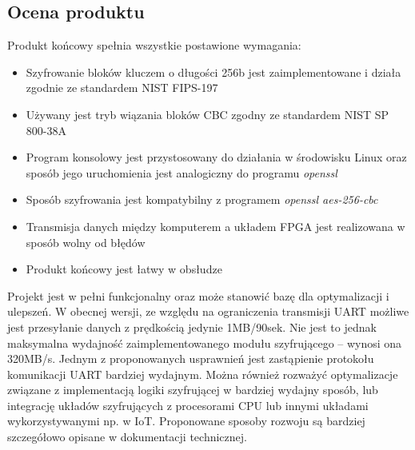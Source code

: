 \subsection{Ocena produktu}
Produkt końcowy spełnia wszystkie postawione wymagania:
\begin{itemize}
\item Szyfrowanie bloków kluczem o długości 256b jest zaimplementowane i działa zgodnie ze standardem NIST FIPS-197 \cite{aes-standard}
\item Używany jest tryb wiązania bloków CBC zgodny ze standardem NIST SP 800-38A \cite{cbc-standard}
\item Program konsolowy jest przystosowany do działania w środowisku Linux oraz sposób jego uruchomienia jest analogiczny do programu \textit{openssl}
\item Sposób szyfrowania jest kompatybilny z programem \textit{openssl aes-256-cbc} 
\item Transmisja danych między komputerem a układem FPGA jest realizowana w sposób wolny od błędów
\item Produkt końcowy jest łatwy w obsłudze
\end{itemize}

Projekt jest w pełni funkcjonalny oraz może stanowić bazę dla optymalizacji i ulepszeń. W obecnej wersji, ze względu na ograniczenia transmisji UART możliwe jest przesyłanie danych z prędkością jedynie 1MB/90sek. Nie jest to jednak maksymalna wydajność zaimplementowanego modułu szyfrującego -- wynosi ona 320MB/s. Jednym z proponowanych usprawnień jest zastąpienie protokołu komunikacji UART bardziej wydajnym. Można również rozważyć optymalizacje związane z implementacją logiki szyfrującej w bardziej wydajny sposób, lub integrację układów szyfrujących z procesorami CPU lub innymi układami wykorzystywanymi np. w IoT. Proponowane sposoby rozwoju są bardziej szczegółowo opisane w dokumentacji technicznej.

\newpage